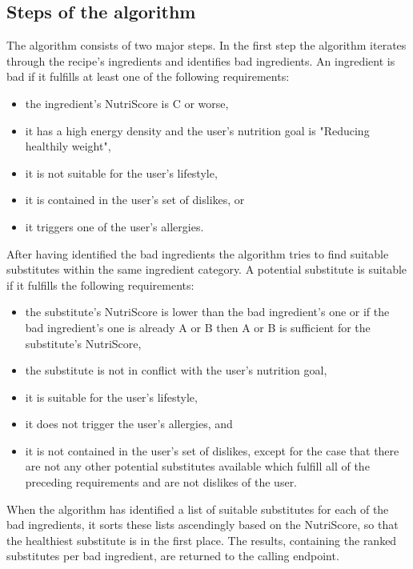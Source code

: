 \subsection*{Steps of the algorithm}
The algorithm consists of two major steps. In the first step the algorithm iterates through the recipe's ingredients and identifies bad ingredients. An ingredient is bad if it fulfills at least one of the following requirements:
\vspace{-1em}
\begin{itemize}
	\itemsep-0.5em 
	\item the ingredient's NutriScore is C or worse,
	\item it has a high energy density and the user's nutrition goal is "Reducing healthily weight",
	\item it is not suitable for the user's lifestyle,
	\item it is contained in the user's set of dislikes, or
	\item it triggers one of the user's allergies.
\end{itemize}
\vspace{1em}
              
After having identified the bad ingredients the algorithm tries to find suitable substitutes within the same ingredient category. A potential substitute is suitable if it fulfills the following requirements:
\vspace{-1em}
\begin{itemize}
	\itemsep-0.5em 
	\item  the substitute's NutriScore is lower than the bad ingredient's one or if the bad ingredient's one is already A or B then A or B is sufficient for the substitute's NutriScore,
	\item the substitute is not in conflict with the user's nutrition goal,
	\item it is suitable for the user's lifestyle,
	\item it does not trigger the user's allergies, and
	\item it is not contained in the user's set of dislikes, except for the case that there are not any other potential substitutes available which fulfill all of the preceding requirements and are not dislikes of the user.
\end{itemize}
\vspace{1em}

When the algorithm has identified a list of suitable substitutes for each of the bad ingredients, it sorts these lists ascendingly based on the NutriScore, so that the healthiest substitute is in the first place. The results, containing the ranked substitutes per bad ingredient, are returned to the calling endpoint.

